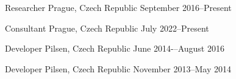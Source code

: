 

\begin{cventries}

  \cventry
    {Researcher} %
    {} %
    {Prague, Czech Republic} %
    {September 2016--Present} %
    {}

    \cventry
    {Consultant} %
    {} %
    {Prague, Czech Republic} %
    {July 2022--Present} %
    {}


  \cventry
    {Developer} %
    {} %
    {Pilsen, Czech Republic} %
    {June 2014-–August 2016} %
    {}

  \cventry
    {Developer} %
    {} %
    {Pilsen, Czech Republic} %
    {November 2013--May 2014} %
    {}


\end{cventries}
